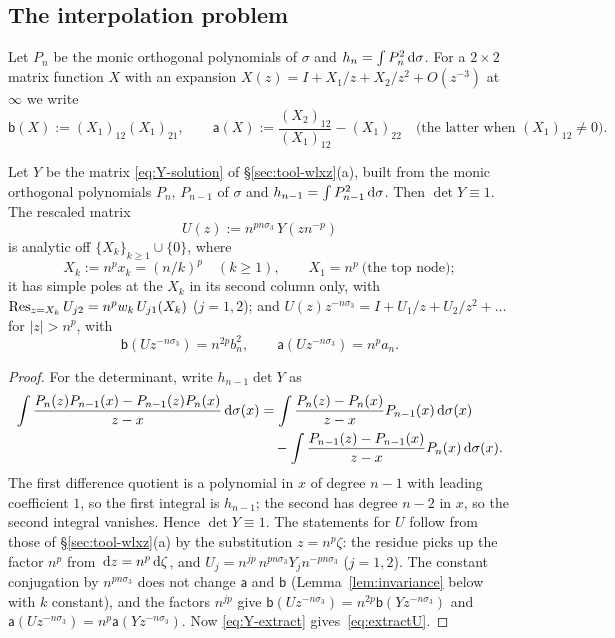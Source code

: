 \subsection{The interpolation problem}\label{sec:frame-interp}
Let $P_n$ be the monic orthogonal polynomials of $\sigma$ and $h_n=\int P_n^2\,\mathrm{d}\sigma$. For a $2\times2$ matrix
function $X$ with an expansion $X(z)=I+X_1/z+X_2/z^2+O(z^{-3})$ at $\infty$ we write
\begin{equation}\label{eq:functional-a}
  \mathsf b(X):=(X_1)_{12}(X_1)_{21},\qquad
  \mathsf a(X):=\frac{(X_2)_{12}}{(X_1)_{12}}-(X_1)_{22}\quad\text{(the latter when $(X_1)_{12}\ne0$).}
\end{equation}

\begin{lemma}\label{lem:interp}
Let $Y$ be the matrix \eqref{eq:Y-solution} of \S\ref{sec:tool-wlxz}(a), built from the monic orthogonal polynomials
$P_n$, $P_{n-1}$ of $\sigma$ and $h_{n-1}=\int P_{n-1}^2\,\mathrm{d}\sigma$. Then $\det Y\equiv1$. The rescaled matrix
\begin{equation}\label{eq:U}
  U(z):=n^{pn\sigma_3}\,Y(zn^{-p})
\end{equation}
is analytic off $\{X_k\}_{k\ge1}\cup\{0\}$, where
\begin{equation}\label{eq:Xk}
  X_k:=n^px_k=(n/k)^p\quad(k\ge1),\qquad X_1=n^p\ \text{(the top node)};
\end{equation}
it has simple poles at the $X_k$ in its second column only, with $\operatorname*{Res}_{z=X_k}U_{j2}=n^pw_k\,U_{j1}(X_k)$ ($j=1,2$);
and $U(z)z^{-n\sigma_3}=I+U_1/z+U_2/z^2+\dots$ for $|z|>n^p$, with
\begin{equation}\label{eq:extractU}
  \mathsf b(Uz^{-n\sigma_3})=n^{2p}b_n^2,\qquad \mathsf a(Uz^{-n\sigma_3})=n^pa_n .
\end{equation}
\end{lemma}

\begin{proof}
For the determinant, write $h_{n-1}\det Y$ as
\begin{align*}
  \int\frac{P_n(z)P_{n-1}(x)-P_{n-1}(z)P_n(x)}{z-x}\,\mathrm{d}\sigma(x)
  &=\int\frac{P_n(z)-P_n(x)}{z-x}P_{n-1}(x)\,\mathrm{d}\sigma(x)\\
  &\quad-\int\frac{P_{n-1}(z)-P_{n-1}(x)}{z-x}P_n(x)\,\mathrm{d}\sigma(x).
\end{align*}
The first difference quotient is a polynomial in $x$ of degree $n-1$ with leading coefficient $1$, so the first
integral is $h_{n-1}$; the second has degree $n-2$ in $x$, so the second integral vanishes. Hence $\det Y\equiv1$.
The statements for $U$ follow from those of \S\ref{sec:tool-wlxz}(a) by the substitution $z=n^p\zeta$: the residue
picks up the factor $n^p$ from $\,\mathrm{d} z=n^p\,\mathrm{d}\zeta$, and $U_j=n^{jp}\,n^{pn\sigma_3}Y_jn^{-pn\sigma_3}$ ($j=1,2$).
The constant conjugation by $n^{pn\sigma_3}$ does not change $\mathsf a$ and $\mathsf b$ (Lemma~\ref{lem:invariance}
below with $k$ constant), and the factors $n^{jp}$ give $\mathsf b(Uz^{-n\sigma_3})=n^{2p}\mathsf b(Yz^{-n\sigma_3})$ and
$\mathsf a(Uz^{-n\sigma_3})=n^p\mathsf a(Yz^{-n\sigma_3})$. Now \eqref{eq:Y-extract} gives~\eqref{eq:extractU}.
\end{proof}

